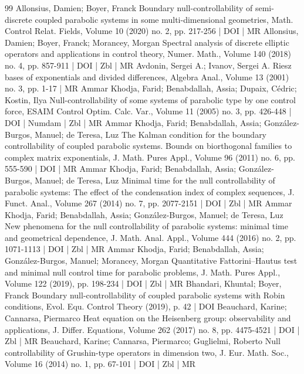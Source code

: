 \begin{thebibliography}{99}
Allonsius, Damien; Boyer, Franck Boundary null-controllability of semi-discrete coupled parabolic systems in some multi-dimensional geometries, Math. Control Relat. Fields, Volume 10 (2020) no. 2, pp. 217-256 | DOI | MR
Allonsius, Damien; Boyer, Franck; Morancey, Morgan Spectral analysis of discrete elliptic operators and applications in control theory, Numer. Math., Volume 140 (2018) no. 4, pp. 857-911 | DOI | Zbl | MR
Avdonin, Sergei A.; Ivanov, Sergei A. Riesz bases of exponentials and divided differences, Algebra Anal., Volume 13 (2001) no. 3, pp. 1-17 | MR
Ammar Khodja, Farid; Benabdallah, Assia; Dupaix, Cédric; Kostin, Ilya Null-controllability of some systems of parabolic type by one control force, ESAIM Control Optim. Calc. Var., Volume 11 (2005) no. 3, pp. 426-448 | DOI | Numdam | Zbl | MR
Ammar Khodja, Farid; Benabdallah, Assia; González-Burgos, Manuel; de Teresa, Luz The Kalman condition for the boundary controllability of coupled parabolic systems. Bounds on biorthogonal families to complex matrix exponentials, J. Math. Pures Appl., Volume 96 (2011) no. 6, pp. 555-590 | DOI | MR
Ammar Khodja, Farid; Benabdallah, Assia; González-Burgos, Manuel; de Teresa, Luz Minimal time for the null controllability of parabolic systems: The effect of the condensation index of complex sequences, J. Funct. Anal., Volume 267 (2014) no. 7, pp. 2077-2151 | DOI | Zbl | MR
Ammar Khodja, Farid; Benabdallah, Assia; González-Burgos, Manuel; de Teresa, Luz New phenomena for the null controllability of parabolic systems: minimal time and geometrical dependence, J. Math. Anal. Appl., Volume 444 (2016) no. 2, pp. 1071-1113 | DOI | Zbl | MR
Ammar Khodja, Farid; Benabdallah, Assia; González-Burgos, Manuel; Morancey, Morgan Quantitative Fattorini–Hautus test and minimal null control time for parabolic problems, J. Math. Pures Appl., Volume 122 (2019), pp. 198-234 | DOI | Zbl | MR
Bhandari, Khuntal; Boyer, Franck Boundary null-controllability of coupled parabolic systems with Robin conditions, Evol. Equ. Control Theory (2019), p. 42 | DOI
Beauchard, Karine; Cannarsa, Piermarco Heat equation on the Heisenberg group: observability and applications, J. Differ. Equations, Volume 262 (2017) no. 8, pp. 4475-4521 | DOI | Zbl | MR
Beauchard, Karine; Cannarsa, Piermarco; Guglielmi, Roberto Null controllability of Grushin-type operators in dimension two, J. Eur. Math. Soc., Volume 16 (2014) no. 1, pp. 67-101 | DOI | Zbl | MR

\end{thebibliography}
